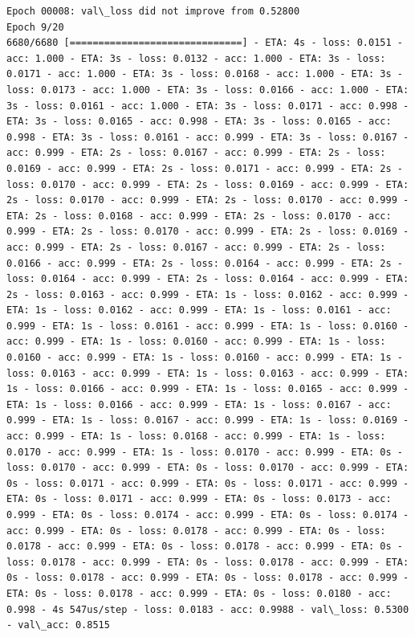 \documentclass[11pt]{article}
\begin{document}
\begin{Verbatim}[commandchars=\\\{\}]
Epoch 00008: val\_loss did not improve from 0.52800
Epoch 9/20
6680/6680 [==============================] - ETA: 4s - loss: 0.0151 - acc: 1.000 - ETA: 3s - loss: 0.0132 - acc: 1.000 - ETA: 3s - loss: 0.0171 - acc: 1.000 - ETA: 3s - loss: 0.0168 - acc: 1.000 - ETA: 3s - loss: 0.0173 - acc: 1.000 - ETA: 3s - loss: 0.0166 - acc: 1.000 - ETA: 3s - loss: 0.0161 - acc: 1.000 - ETA: 3s - loss: 0.0171 - acc: 0.998 - ETA: 3s - loss: 0.0165 - acc: 0.998 - ETA: 3s - loss: 0.0165 - acc: 0.998 - ETA: 3s - loss: 0.0161 - acc: 0.999 - ETA: 3s - loss: 0.0167 - acc: 0.999 - ETA: 2s - loss: 0.0167 - acc: 0.999 - ETA: 2s - loss: 0.0169 - acc: 0.999 - ETA: 2s - loss: 0.0171 - acc: 0.999 - ETA: 2s - loss: 0.0170 - acc: 0.999 - ETA: 2s - loss: 0.0169 - acc: 0.999 - ETA: 2s - loss: 0.0170 - acc: 0.999 - ETA: 2s - loss: 0.0170 - acc: 0.999 - ETA: 2s - loss: 0.0168 - acc: 0.999 - ETA: 2s - loss: 0.0170 - acc: 0.999 - ETA: 2s - loss: 0.0170 - acc: 0.999 - ETA: 2s - loss: 0.0169 - acc: 0.999 - ETA: 2s - loss: 0.0167 - acc: 0.999 - ETA: 2s - loss: 0.0166 - acc: 0.999 - ETA: 2s - loss: 0.0164 - acc: 0.999 - ETA: 2s - loss: 0.0164 - acc: 0.999 - ETA: 2s - loss: 0.0164 - acc: 0.999 - ETA: 2s - loss: 0.0163 - acc: 0.999 - ETA: 1s - loss: 0.0162 - acc: 0.999 - ETA: 1s - loss: 0.0162 - acc: 0.999 - ETA: 1s - loss: 0.0161 - acc: 0.999 - ETA: 1s - loss: 0.0161 - acc: 0.999 - ETA: 1s - loss: 0.0160 - acc: 0.999 - ETA: 1s - loss: 0.0160 - acc: 0.999 - ETA: 1s - loss: 0.0160 - acc: 0.999 - ETA: 1s - loss: 0.0160 - acc: 0.999 - ETA: 1s - loss: 0.0163 - acc: 0.999 - ETA: 1s - loss: 0.0163 - acc: 0.999 - ETA: 1s - loss: 0.0166 - acc: 0.999 - ETA: 1s - loss: 0.0165 - acc: 0.999 - ETA: 1s - loss: 0.0166 - acc: 0.999 - ETA: 1s - loss: 0.0167 - acc: 0.999 - ETA: 1s - loss: 0.0167 - acc: 0.999 - ETA: 1s - loss: 0.0169 - acc: 0.999 - ETA: 1s - loss: 0.0168 - acc: 0.999 - ETA: 1s - loss: 0.0170 - acc: 0.999 - ETA: 1s - loss: 0.0170 - acc: 0.999 - ETA: 0s - loss: 0.0170 - acc: 0.999 - ETA: 0s - loss: 0.0170 - acc: 0.999 - ETA: 0s - loss: 0.0171 - acc: 0.999 - ETA: 0s - loss: 0.0171 - acc: 0.999 - ETA: 0s - loss: 0.0171 - acc: 0.999 - ETA: 0s - loss: 0.0173 - acc: 0.999 - ETA: 0s - loss: 0.0174 - acc: 0.999 - ETA: 0s - loss: 0.0174 - acc: 0.999 - ETA: 0s - loss: 0.0178 - acc: 0.999 - ETA: 0s - loss: 0.0178 - acc: 0.999 - ETA: 0s - loss: 0.0178 - acc: 0.999 - ETA: 0s - loss: 0.0178 - acc: 0.999 - ETA: 0s - loss: 0.0178 - acc: 0.999 - ETA: 0s - loss: 0.0178 - acc: 0.999 - ETA: 0s - loss: 0.0178 - acc: 0.999 - ETA: 0s - loss: 0.0178 - acc: 0.999 - ETA: 0s - loss: 0.0180 - acc: 0.998 - 4s 547us/step - loss: 0.0183 - acc: 0.9988 - val\_loss: 0.5300 - val\_acc: 0.8515


\end{Verbatim}
\end{document}
